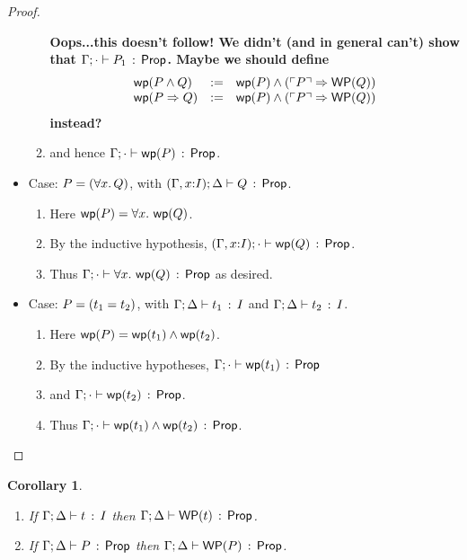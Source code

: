 \documentclass[10pt,a4paper]{article}
\newtheorem{corollary}[theorem]{Corollary}
\begin{document}
\begin{proof}
\begin{itemize}
\begin{enumerate}
         {\bf Oops...this doesn't follow!  We didn't (and in
           general can't) show that $\Gamma;\cdot \vdash P_1\, :\, \mathsf{Prop}$.
         Maybe we should define 
\[
\begin{array}{lll}
\mathop{\mathsf{wp}}(P \wedge Q) &:=& \mathop{\mathsf{wp}}(P) \wedge (\ulcorner P \urcorner \Rightarrow \mathop{\mathsf{WP}}(Q))\\
\mathop{\mathsf{wp}}(P \Rightarrow Q) &:=& \mathop{\mathsf{wp}}(P) \wedge (\ulcorner P \urcorner \Rightarrow \mathop{\mathsf{WP}}(Q))\\
\end{array}
\]
instead?
}
         
       \item
         and hence $\Gamma;\cdot \vdash \mathop{\mathsf{wp}}(P)\, :\, \mathsf{Prop}$.
       \end{enumerate}
  \item Case: $P=(\forall x.\, Q)$, 
        with $(\Gamma,x{:}I);\Delta \vdash Q\, :\, \mathsf{Prop}$.
  	\begin{enumerate}
	\item 
		Here $\mathop{\mathsf{wp}}(P) = \forall x.\, \mathop{\mathsf{wp}}(Q)$.
	\item 
		By the inductive hypothesis,
	   $(\Gamma,x{:}I);\cdot \vdash \mathop{\mathsf{wp}}(Q)\, :\, \mathsf{Prop}$.
	\item 
		Thus
	   $\Gamma;\cdot \vdash \forall x.\, \mathop{\mathsf{wp}}(Q)\, :\, \mathsf{Prop}$ as desired.
	\end{enumerate}
  \item Case: $P = (t_1 = t_2)$, with $\Gamma;\Delta \vdash t_1\, :\, I$ and $\Gamma;\Delta \vdash t_2\, :\, I$. 
    	\begin{enumerate}
	\item 
		Here $\mathop{\mathsf{wp}}(P) = \mathop{\mathsf{wp}}(t_1) \wedge \mathop{\mathsf{wp}}(t_2)$.
	\item 
		By the inductive hypotheses,
		$\Gamma;\cdot \vdash \mathop{\mathsf{wp}}(t_1)\, :\, \mathsf{Prop}$ 
	\item 
		and $\Gamma;\cdot \vdash \mathop{\mathsf{wp}}(t_2)\, :\, \mathsf{Prop}$.
	\item
		Thus $\Gamma;\cdot \vdash \mathop{\mathsf{wp}}(t_1) \wedge \mathop{\mathsf{wp}}(t_2)\, :\, \mathsf{Prop}$.
	\end{enumerate}
  \end{itemize}
\end{proof}

\begin{corollary}
\mbox{}
\begin{enumerate}
\item If $\Gamma;\Delta \vdash t\, :\, I$ then
  $\Gamma;\Delta \vdash \mathop{\mathsf{WP}}(t)\, :\, \mathsf{Prop}$.
\item If $\Gamma;\Delta \vdash P\, :\, \mathsf{Prop}$ then
  $\Gamma;\Delta \vdash \mathop{\mathsf{WP}}(P)\, :\, \mathsf{Prop}$.
\end{enumerate}
\end{corollary}
\end{document}
